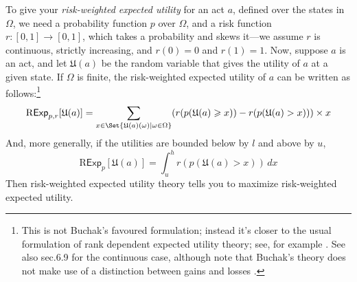 \documentclass[a4paper]{article}
\newcommand\Exp{\mathsf{Exp}}
\newcommand\RExp{\mathrm{R}\Exp} %
\newcommand\U{\mathfrak{U}} %
\newcommand\SetDelimiter[1][]{
	\nonscript\,#1\vert \allowbreak \nonscript\,\mathopen{}}
\providecommand\given{\SetDelimiter}
\renewcommand{\geq}{\geqslant}
\newenvironment{CCM rewritten}
{\begingroup\color{blue}} %
{\endgroup}              %
\begin{document}
To give your \textit{risk-weighted expected utility} for an act $a$, defined over the states in $\Omega$, we need a probability function $p$ over $\Omega$, and a risk function $r : [0, 1] \rightarrow [0, 1]$, which takes a probability and skews it---we assume $r$ is continuous, strictly increasing, and $r(0)= 0$ and $r(1) = 1$. Now, suppose $a$ is an act, and let $\U(a)$ be the random variable that gives the utility of $a$ at a given state. 
If $\Omega$ is finite, the risk-weighted expected utility of $a$ can be written as follows:\footnote{This is not Buchak's favoured formulation; instead it's closer to the usual formulation of rank dependent expected utility theory; see, for example \citep[ch.6]{wakker2010prospect}.  See also sec.6.9 for the continuous case, although note that Buchak's theory does not make use of a distinction between gains and losses \citep[see][p59]{buchak2014rr}. }%
$$
\RExp_{p, r}[\U(a)] = \sum_{x \in \Set{\U(a)(\omega)\given \omega \in \Omega}} (r(p(\U(a) \geq x)) - r(p(\U(a) > x)))\times x
$$
And, more generally, if the utilities are bounded below by $l$ and above by $u$,
$$
\RExp_p[\U(a)] = \int^h_{u} r(p(\U(a) > x))\, dx
$$
Then risk-weighted expected utility theory tells you to maximize risk-weighted expected utility.


\end{document}
